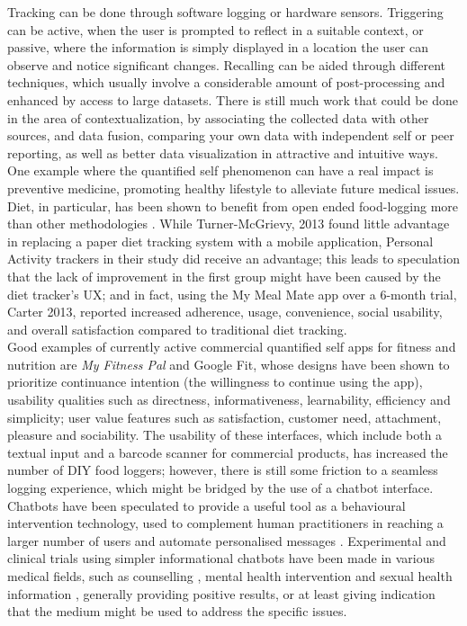 Tracking can be done through software logging or hardware sensors. Triggering can be active, when the user is prompted to reflect in a suitable context, or passive, where the information is simply displayed in a location the user can observe and notice significant changes. Recalling can be aided through different techniques, which usually involve a considerable amount of post-processing and enhanced by access to large datasets. There is still much work that could be done in the area of contextualization, by associating the collected data with other sources, and data fusion, comparing your own data with independent self or peer reporting, as well as better data visualization in attractive and intuitive ways. \\
One example where the quantified self phenomenon can have a real impact is preventive medicine, promoting healthy lifestyle to alleviate future medical issues. Diet, in particular, has been shown to benefit from open ended food-logging more than other methodologies \cite{Bingham1994}. While Turner-McGrievy, 2013 \cite{doi:10.1136/amiajnl-2012-001510} found little advantage in replacing a paper diet tracking system with a mobile application, Personal Activity trackers in their study did receive an advantage; this leads to speculation that the lack of improvement in the first group might have been caused by the diet tracker's UX; and in fact, using the My Meal Mate app over a 6-month trial, Carter 2013, \cite{carter2013adherence} reported increased adherence, usage, convenience, social usability, and overall satisfaction compared to traditional diet tracking. \\
Good examples of currently active commercial quantified self apps for fitness and nutrition are \textit{My Fitness Pal}\cite{mfpwebsite} and Google Fit\cite{googlefitwebsite}, whose designs have been shown \cite{Suzianti2017} to prioritize continuance intention (the willingness to continue using the app), usability qualities such as directness, informativeness, learnability, efficiency and simplicity; user value features such as satisfaction, customer need, attachment, pleasure and sociability. The usability of these interfaces, which include both a textual input and a barcode scanner for commercial products, has increased the number of DIY food loggers\cite{Alonso2015}; however, there is still some friction to a seamless logging experience\cite{Brixey2016}, which might be bridged by the use of a chatbot interface.  \\
Chatbots have been speculated to provide a useful tool as a behavioural intervention technology, used to complement human practitioners in reaching a larger number of users and automate personalised messages \cite{Gabrielli2017}. Experimental and clinical trials using simpler informational chatbots have been made in various medical fields, such as counselling \cite{Cameron}, mental health intervention \cite{Elmasri2012} and sexual health information \cite{Brixey2017}, generally providing positive results, or at least giving indication that the medium might be used to address the specific issues.
